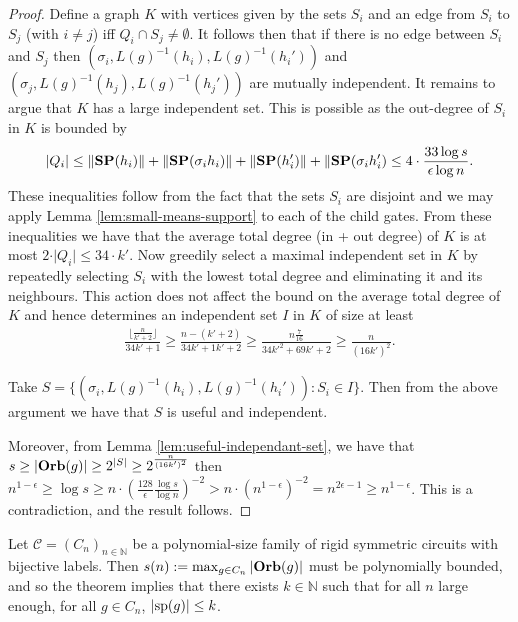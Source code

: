 \documentclass[../paper.tex]{subfiles}
\begin{document}
\begin{proof}
  Define a graph $K$ with vertices given by the sets $S_i$ and an edge from
  $S_i$ to $S_j$ (with $i \neq j$) iff $Q_i \cap S_j \neq \emptyset$. It follows
  then that if there is no edge between $S_i$ and $S_j$ then $(\sigma_i,
  L(g)^{-1}(h_i), L(g)^{-1}(h_i'))$ and $(\sigma_j, L(g)^{-1}(h_j),
  L(g)^{-1}(h_j'))$ are mutually independent. It remains to argue that $K$ has a
  large independent set. This is possible as the out-degree of $S_i$ in $K$ is
  bounded by
  \begin{align*}
    \vert Q_i \vert \leq \|\text{\textbf{SP}}(h_i) \| + \|\text{\textbf{SP}}(\sigma_i h_i) \| + \|\text{\textbf{SP}}(h_i') \| + \|\text{\textbf{SP}}(\sigma_i h_i') \leq 4 \cdot \frac{33\log s}{\epsilon \log n}.
  \end{align*}
  These inequalities follow from the fact that the sets $S_i$ are disjoint and we may apply Lemma
  \ref{lem:small-means-support} to each of the child gates. From these inequalities
  we have that the average total degree (in + out degree) of $K$ is at most $2 \cdot \vert Q_i
  \vert \leq 34 \cdot k'$. Now greedily select a maximal independent set in $K$
  by repeatedly selecting $S_i$ with the lowest total degree and eliminating it
  and its neighbours. This action does not affect the bound on the average total
  degree of $K$ and hence determines an independent set $I$ in $K$ of size at
  least
  \begin{align*}
    \frac{\lfloor \frac{n}{k' + 2} \rfloor}{34k' + 1} \geq \frac{n - (k'+2)}{34k'+1k'+2} \geq \frac{n\frac{7}{16}}{34k'^2 + 69k' +2} \geq \frac{n}{(16k')^2}.
  \end{align*}

  Take $S = \{(\sigma_i, L(g)^{-1}(h_i), L(g)^{-1}(h_i')) : S_i \in I \}$. Then
  from the above argument we have that $S$ is useful and independent.
  
  Moreover, from Lemma \ref{lem:useful-independant-set}, we have that $s \geq
  \vert \text{\textbf{Orb}}(g) \vert \geq 2^{\vert S \vert} \geq 2^{\frac{n}{(16k')^2}}$ then
  $n^{1-\epsilon} \geq \log s \geq n \cdot (\frac{128}{\epsilon}\frac{\log
    s}{\log n})^{-2} > n \cdot (n^{1-\epsilon})^{-2} = n^{2\epsilon -1} \geq
  n^{1-\epsilon}$. This is a contradiction, and the result follows.
\end{proof}
 
Let $\mathcal{C} = (C_n)_{n \in \mathbb{N}}$ be a polynomial-size family of
rigid symmetric circuits with bijective labels. Then $s(n) := \max_{g \in C_n}
\vert \text{\textbf{Orb}} (g)\vert$ must be polynomially bounded, and so the theorem implies
that there exists $k \in \mathbb{N}$ such that for all $n$ large enough, for all
$g \in C_n$, $\vert \text{sp}(g) \vert \leq k$.
\end{document}
